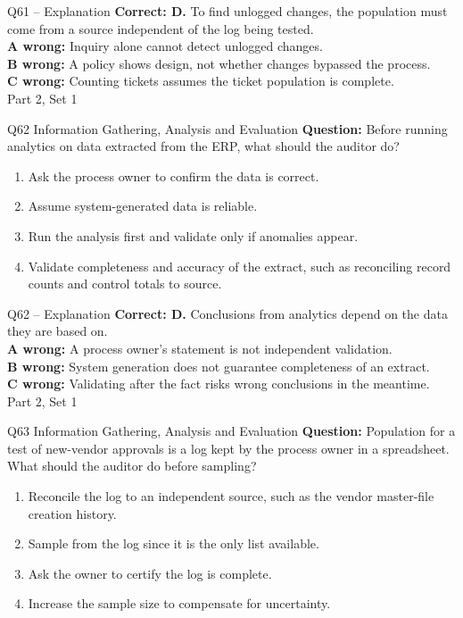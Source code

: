 \documentclass[aspectratio=169,10pt]{beamer}
\begin{document}
\begin{frame}[t]{Q61 -- Explanation}
	\footnotesize
	\textbf{Correct: D.} To find unlogged changes, the population must come from a source independent of the log being tested. \\[5pt]
\textbf{A wrong:} Inquiry alone cannot detect unlogged changes. \\[3pt]
\textbf{B wrong:} A policy shows design, not whether changes bypassed the process. \\[3pt]
\textbf{C wrong:} Counting tickets assumes the ticket population is complete. \\[3pt]
	\vfill {\tiny Part 2, Set 1}
\end{frame}
\begin{frame}[t]{Q62 \hfill {\scriptsize Information Gathering, Analysis and Evaluation}}
	\small
	\textbf{Question:} Before running analytics on data extracted from the ERP, what should the auditor do?
	\begin{enumerate}[label=\Alph*.,itemsep=1pt,topsep=3pt]
			\item Ask the process owner to confirm the data is correct.
			\item Assume system-generated data is reliable.
			\item Run the analysis first and validate only if anomalies appear.
			\item Validate completeness and accuracy of the extract, such as reconciling record counts and control totals to source.
	\end{enumerate}
\end{frame}
\begin{frame}[t]{Q62 -- Explanation}
	\footnotesize
	\textbf{Correct: D.} Conclusions from analytics depend on the data they are based on. \\[5pt]
\textbf{A wrong:} A process owner's statement is not independent validation. \\[3pt]
\textbf{B wrong:} System generation does not guarantee completeness of an extract. \\[3pt]
\textbf{C wrong:} Validating after the fact risks wrong conclusions in the meantime. \\[3pt]
	\vfill {\tiny Part 2, Set 1}
\end{frame}
\begin{frame}[t]{Q63 \hfill {\scriptsize Information Gathering, Analysis and Evaluation}}
	\small
	\textbf{Question:} Population for a test of new-vendor approvals is a log kept by the process owner in a spreadsheet. What should the auditor do before sampling?
	\begin{enumerate}[label=\Alph*.,itemsep=1pt,topsep=3pt]
			\item Reconcile the log to an independent source, such as the vendor master-file creation history.
			\item Sample from the log since it is the only list available.
			\item Ask the owner to certify the log is complete.
			\item Increase the sample size to compensate for uncertainty.
	\end{enumerate}
\end{frame}
\end{document}

